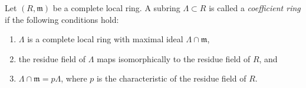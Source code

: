 \begin{definition}
\label{definition-coefficient-ring}
Let $(R, \mathfrak m)$ be a complete local ring.
A subring $\Lambda \subset R$ is
called a {\it coefficient ring} if the following conditions hold:
\begin{enumerate}
\item $\Lambda$ is a complete local ring with maximal ideal
$\Lambda \cap \mathfrak m$,
\item the residue field of $\Lambda$ maps isomorphically to the
residue field of $R$, and
\item $\Lambda \cap \mathfrak m = p\Lambda$, where $p$ is the characteristic
of the residue field of $R$.
\end{enumerate}
\end{definition}